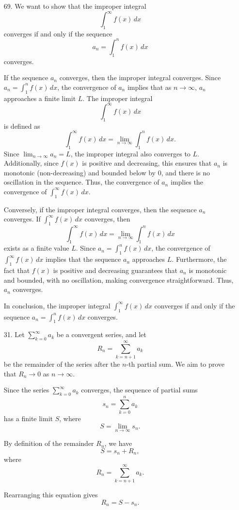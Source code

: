 \documentclass[12pt]{article}
\begin{document}
\begin{enumerate}
\item [69.]
We want to show that the improper integral  
\[
\int_1^\infty f(x) \, dx
\]  
converges if and only if the sequence  
\[
a_n = \int_1^n f(x) \, dx
\]  
converges.

If the sequence \(a_n\) converges, then the improper integral converges. Since \(a_n = \int_1^n f(x) \, dx\), the convergence of \(a_n\) implies that as \(n \to \infty\), \(a_n\) approaches a finite limit \(L\). The improper integral  
\[
\int_1^\infty f(x) \, dx
\]  
is defined as  
\[
\int_1^\infty f(x) \, dx = \lim_{n \to \infty} \int_1^n f(x) \, dx.
\]  
Since \(\lim_{n \to \infty} a_n = L\), the improper integral also converges to \(L\). Additionally, since \(f(x)\) is positive and decreasing, this ensures that \(a_n\) is monotonic (non-decreasing) and bounded below by 0, and there is no oscillation in the sequence. Thus, the convergence of \(a_n\) implies the convergence of \(\int_1^\infty f(x) \, dx\).

Conversely, if the improper integral converges, then the sequence \(a_n\) converges. If \(\int_1^\infty f(x) \, dx\) converges, then  
\[
\int_1^\infty f(x) \, dx = \lim_{n \to \infty} \int_1^n f(x) \, dx
\]  
exists as a finite value \(L\). Since \(a_n = \int_1^n f(x) \, dx\), the convergence of \(\int_1^\infty f(x) \, dx\) implies that the sequence \(a_n\) approaches \(L\). Furthermore, the fact that \(f(x)\) is positive and decreasing guarantees that \(a_n\) is monotonic and bounded, with no oscillation, making convergence straightforward. Thus, \(a_n\) converges.

In conclusion, the improper integral \(\int_1^\infty f(x) \, dx\) converges if and only if the sequence \(a_n = \int_1^n f(x) \, dx\) converges.
\item [31. ]
 Let \(\sum_{k=0}^\infty a_k\) be a convergent series, and let 
\[
R_n = \sum_{k=n+1}^\infty a_k
\]
be the remainder of the series after the \(n\)-th partial sum. We aim to prove that \(R_n \to 0\) as \(n \to \infty\).

Since the series \(\sum_{k=0}^\infty a_k\) converges, the sequence of partial sums
\[
s_n = \sum_{k=0}^n a_k
\]
has a finite limit \(S\), where 
\[
S = \lim_{n \to \infty} s_n.
\]

By definition of the remainder \(R_n\), we have
\[
S = s_n + R_n,
\]
where
\[
R_n = \sum_{k=n+1}^\infty a_k.
\]

Rearranging this equation gives
\[
R_n = S - s_n.
\]


\end{enumerate}
\end{document}
